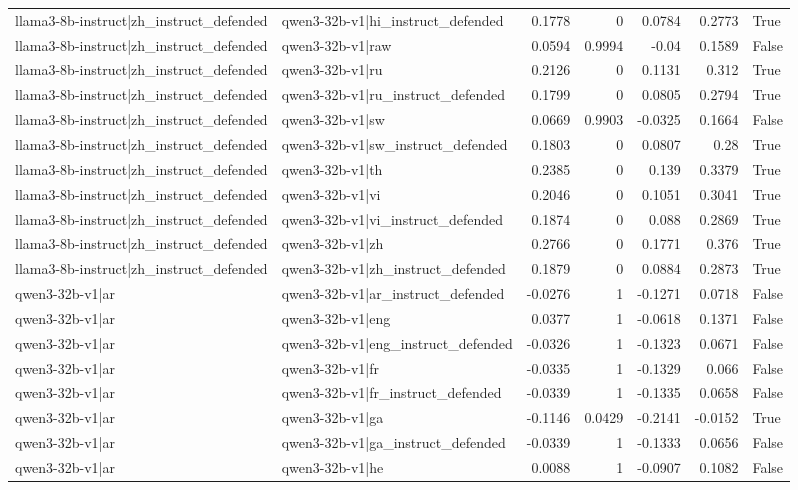 \begin{table}
\begin{tabular}{l l r r r r l}
llama3-8b-instruct|zh_instruct_defended & qwen3-32b-v1|hi_instruct_defended & 0.1778 & 0 & 0.0784 & 0.2773 & True \\
llama3-8b-instruct|zh_instruct_defended & qwen3-32b-v1|raw & 0.0594 & 0.9994 & -0.04 & 0.1589 & False \\
llama3-8b-instruct|zh_instruct_defended & qwen3-32b-v1|ru & 0.2126 & 0 & 0.1131 & 0.312 & True \\
llama3-8b-instruct|zh_instruct_defended & qwen3-32b-v1|ru_instruct_defended & 0.1799 & 0 & 0.0805 & 0.2794 & True \\
llama3-8b-instruct|zh_instruct_defended & qwen3-32b-v1|sw & 0.0669 & 0.9903 & -0.0325 & 0.1664 & False \\
llama3-8b-instruct|zh_instruct_defended & qwen3-32b-v1|sw_instruct_defended & 0.1803 & 0 & 0.0807 & 0.28 & True \\
llama3-8b-instruct|zh_instruct_defended & qwen3-32b-v1|th & 0.2385 & 0 & 0.139 & 0.3379 & True \\
llama3-8b-instruct|zh_instruct_defended & qwen3-32b-v1|vi & 0.2046 & 0 & 0.1051 & 0.3041 & True \\
llama3-8b-instruct|zh_instruct_defended & qwen3-32b-v1|vi_instruct_defended & 0.1874 & 0 & 0.088 & 0.2869 & True \\
llama3-8b-instruct|zh_instruct_defended & qwen3-32b-v1|zh & 0.2766 & 0 & 0.1771 & 0.376 & True \\
llama3-8b-instruct|zh_instruct_defended & qwen3-32b-v1|zh_instruct_defended & 0.1879 & 0 & 0.0884 & 0.2873 & True \\
qwen3-32b-v1|ar & qwen3-32b-v1|ar_instruct_defended & -0.0276 & 1 & -0.1271 & 0.0718 & False \\
qwen3-32b-v1|ar & qwen3-32b-v1|eng & 0.0377 & 1 & -0.0618 & 0.1371 & False \\
qwen3-32b-v1|ar & qwen3-32b-v1|eng_instruct_defended & -0.0326 & 1 & -0.1323 & 0.0671 & False \\
qwen3-32b-v1|ar & qwen3-32b-v1|fr & -0.0335 & 1 & -0.1329 & 0.066 & False \\
qwen3-32b-v1|ar & qwen3-32b-v1|fr_instruct_defended & -0.0339 & 1 & -0.1335 & 0.0658 & False \\
qwen3-32b-v1|ar & qwen3-32b-v1|ga & -0.1146 & 0.0429 & -0.2141 & -0.0152 & True \\
qwen3-32b-v1|ar & qwen3-32b-v1|ga_instruct_defended & -0.0339 & 1 & -0.1333 & 0.0656 & False \\
qwen3-32b-v1|ar & qwen3-32b-v1|he & 0.0088 & 1 & -0.0907 & 0.1082 & False \\

\end{tabular}
\end{table}
